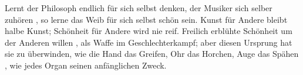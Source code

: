 Lernt der Philosoph endlich für sich selbst denken, der Musiker sich selber zuhören , so lerne das Weib für sich selbst schön sein. Kunst für Andere bleibt halbe Kunst; Schönheit für Andere wird nie reif. Freilich erblühte Schönheit um der Anderen willen , als Waffe im Geschlechterkampf; aber diesen Ursprung hat sie zu überwinden, wie die Hand das Greifen, Ohr das Horchen, Auge das Spähen , wie jedes Organ seinen anfänglichen Zweck.
\par

